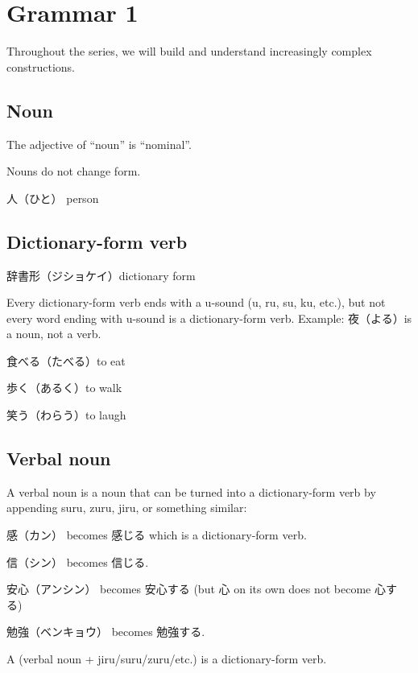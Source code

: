\chapter{Grammar 1}

Throughout the series, we will build and understand increasingly complex constructions.

\section{Noun}

The adjective of ``noun'' is ``nominal''.

Nouns do not change form.

人（ひと） person

\section{Dictionary-form verb}

辞書形（ジショケイ）dictionary form

Every dictionary-form verb ends with a u-sound (u, ru, su, ku, etc.),
but not every word ending with u-sound is a dictionary-form verb.
Example: 夜（よる）is a noun, not a verb.

食べる（たべる）to eat

歩く（あるく）to walk

笑う（わらう）to laugh

\section{Verbal noun}

A verbal noun is a noun that can be turned into a dictionary-form verb
by appending suru, zuru, jiru, or something similar:

感（カン） becomes 感じる which is a dictionary-form verb.

信（シン） becomes 信じる.

安心（アンシン） becomes 安心する (but 心 on its own does not become 心する)

勉強（ベンキョウ） becomes 勉強する.

A (verbal noun + jiru/suru/zuru/etc.) is a dictionary-form verb.
